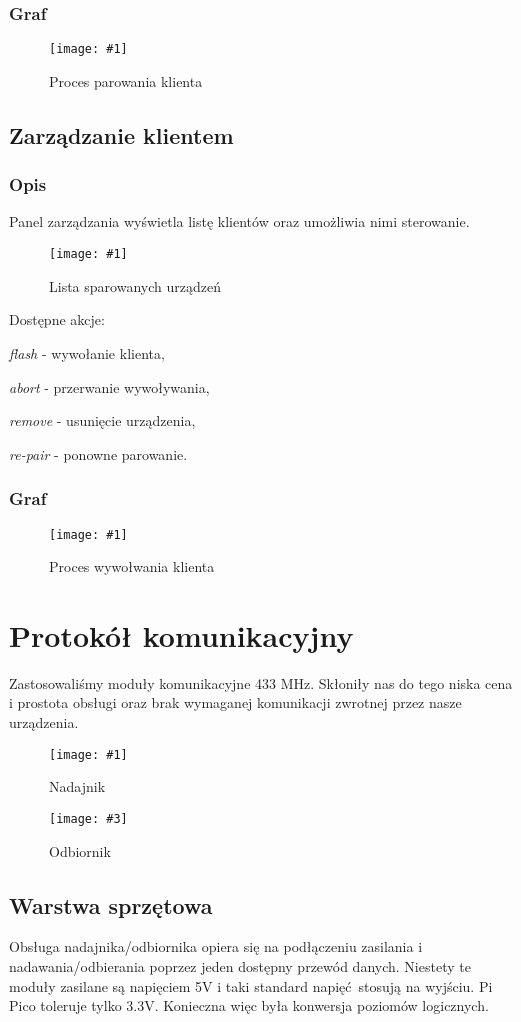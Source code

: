 \documentclass[12pt]{article}
\let\tempone\itemize
\let\temptwo\enditemize
\renewenvironment{itemize}{\tempone\setlength{\itemsep}{0cm}}{\temptwo}
\newcommand{\imgcustomsize}[3]{
	\begin{figure}[H]
		\centering
		\texttt{[image: \#1]}
		\caption{#2}
	\end{figure}
}
\newcommand{\img}[2]{\imgcustomsize{#1}{#2}{0.8}}
\newcommand{\imgsidebyside}[4]{
	\begin{figure}[H]
		\centering
		\begin{minipage}{.45\textwidth}
			\centering
			\texttt{[image: \#1]}
			\caption{#2}
		\end{minipage}%
		\hfill
		\begin{minipage}{.45\textwidth}
			\centering
			\texttt{[image: \#3]}
			\caption{#4}
		\end{minipage}
	\end{figure}
}
\begin{document}
        \subsubsection{Graf}
        \img{graphs/pairing}{Proces parowania klienta}

        \pagebreak
        \subsection{Zarządzanie klientem}
        \subsubsection{Opis}
        Panel zarządzania wyświetla listę klientów oraz umożliwia nimi sterowanie.
        \img{config/pagers_list}{Lista sparowanych urządzeń}
        Dostępne akcje:
        \begin{itemize}
            \item \emph{flash} - wywołanie klienta,
            \item \emph{abort} - przerwanie wywoływania,
            \item \emph{remove} - usunięcie urządzenia,
            \item \emph{re-pair} - ponowne parowanie.
        \end{itemize}
        \subsubsection{Graf}
        \img{graphs/flashing}{Proces wywołwania klienta}

    \pagebreak

    \section{Protokół komunikacyjny}
		Zastosowaliśmy moduły komunikacyjne 433 MHz. Skłoniły nas do tego niska cena i prostota obsługi oraz brak wymaganej komunikacji zwrotnej przez nasze urządzenia.

		\imgsidebyside{dev/tx}{Nadajnik}{dev/rx}{Odbiornik}
		\subsection{Warstwa sprzętowa}
			Obsługa nadajnika/odbiornika opiera się na podłączeniu zasilania i nadawania/odbierania poprzez jeden dostępny przewód danych. Niestety te moduły zasilane są napięciem 5V i taki standard napięć stosują na wyjściu. Pi Pico toleruje tylko 3.3V. Konieczna więc była konwersja poziomów logicznych.
\end{document}
